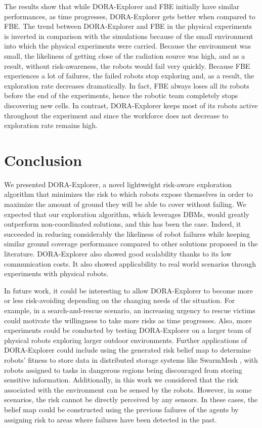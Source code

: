 \documentclass[letterpaper, 10 pt, conference]{ieeeconf}
\begin{document}
The results show that while DORA-Explorer and FBE initially have similar performances, as time progresses,
DORA-Explorer gets better when compared to FBE. The trend between DORA-Explorer and FBE in the physical experiments is inverted in comparison with the simulations because of the small environment into which the physical experiments were carried. Because the environment was small, the likeliness of getting close of the radiation source was high, and as a result, without risk-awareness, the robots would fail very quickly. Because FBE
experiences a lot of failures, the failed robots stop exploring and, as
a result, the exploration rate decreases dramatically. In fact, FBE
always loses all its robots before the end of the experiments, hence
the robotic team completely stops discovering new cells. In contrast,
DORA-Explorer keeps most of its robots active throughout the experiment and
since the workforce does not decrease to exploration rate remains
high.

\section{Conclusion}
We presented DORA-Explorer, a novel lightweight risk-aware exploration
algorithm that minimizes the risk to which robots expose themselves in
order to maximize the amount of ground they will be able to cover
without failing. We expected that our exploration algorithm, which
leverages DBMs, would greatly outperform non-coordinated solutions,
and this has been the case. Indeed, it succeeded in reducing
considerably the likeliness of robot failures while keeping similar
ground coverage performance compared to other solutions proposed in
the literature. DORA-Explorer also showed good scalability thanks to its low
communication costs. It also showed applicability to real world
scenarios through experiments with physical robots.

In future work, it could be interesting to allow DORA-Explorer to become more
or less risk-avoiding depending on the changing needs of the
situation. For example, in a search-and-rescue scenario, an increasing
urgency to rescue victims could motivate the willingness to take more
risks as time progresses. Also, more experiments could be conducted by
testing DORA-Explorer on a larger team of physical robots exploring
larger outdoor environments. Further applications of DORA-Explorer could
include using the generated risk belief map to determine robots'
fitness to store data in distributed storage systems like SwarmMesh
\cite{majcherczykSwarmmesh2020}, with robots assigned to tasks in
dangerous regions being discouraged from storing sensitive
information. Additionally, in this work we considered that the risk
associated with the environment can be sensed by the robots. However,
in some scenarios, the risk cannot be directly perceived by any
sensors. In these cases, the belief map could be constructed using the
previous failures of the agents by assigning risk to areas where
failures have been detected in the past.




\end{document}
